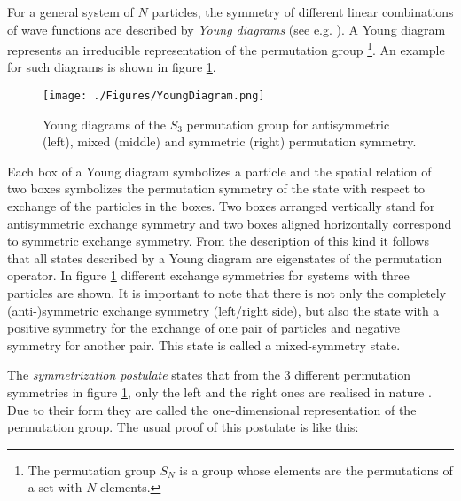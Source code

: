 For a general system of $N$ particles, the symmetry of different linear combinations of wave functions are described by \textit{Young diagrams} (see e.g. \cite{Kaplan2013}). A Young diagram represents an irreducible representation of the permutation group \footnote{The permutation group $S_{N}$ is a group whose elements are the permutations of a set with $N$ elements.}. An example for such diagrams is shown in figure \ref{fig:YoungDiag}.
\begin{figure}[h]
 \centering
 \texttt{[image: ./Figures/YoungDiagram.png]}
 \caption{Young diagrams of the $S_{3}$ permutation group for antisymmetric (left), mixed (middle) and symmetric (right) permutation symmetry.}
 \label{fig:YoungDiag}
\end{figure}
Each box of a Young diagram symbolizes a particle and the spatial relation of two boxes symbolizes the permutation symmetry of the state with respect to exchange of the particles in the boxes. Two boxes arranged vertically stand for antisymmetric exchange symmetry and two boxes aligned horizontally correspond to symmetric exchange symmetry. From the description of this kind it follows that all states described by a Young diagram are eigenstates of the permutation operator. In figure \ref{fig:YoungDiag} different exchange symmetries for systems with three particles are shown. It is important to note that there is not only the completely (anti-)symmetric exchange symmetry (left/right side), but also the state with a positive symmetry for the exchange of one pair of particles and negative symmetry for another pair. This state is called a mixed-symmetry state.

The \textit{symmetrization postulate} states that from the 3 different permutation symmetries in figure \ref{fig:YoungDiag}, only the left and the right ones are realised in nature \cite{Messiah1964}. Due to their form they are called the one-dimensional representation of the permutation group. The usual proof of this postulate is like this:

